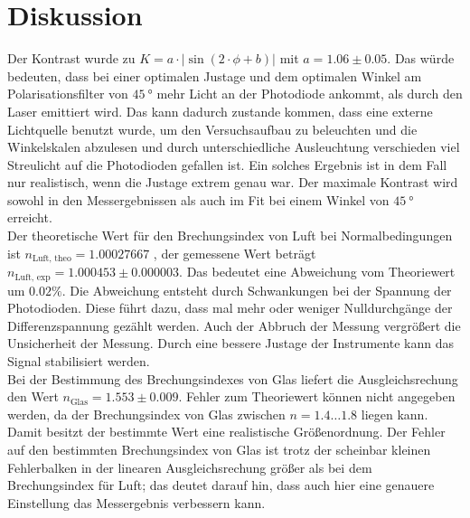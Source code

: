 \section{Diskussion}

Der Kontrast wurde zu $K = a \cdot | \sin (2 \cdot \phi + b) |$ mit $a = 1.06 \pm 0.05$. Das würde
bedeuten, dass bei einer optimalen Justage und dem optimalen Winkel am Polarisationsfilter von
$\SI{45}{\degree}$ mehr Licht an der Photodiode ankommt, als durch den Laser emittiert wird. Das kann
dadurch zustande kommen, dass eine externe Lichtquelle benutzt wurde, um den Versuchsaufbau zu beleuchten
und die Winkelskalen abzulesen und durch unterschiedliche Ausleuchtung verschieden viel Streulicht
auf die Photodioden gefallen ist. Ein solches Ergebnis ist in dem Fall nur realistisch, wenn die
Justage extrem genau war. Der maximale Kontrast wird sowohl in den Messergebnissen als auch im Fit bei
einem Winkel von $\SI{45}{\degree}$ erreicht.\\
\newline
Der theoretische Wert für den Brechungsindex von Luft bei Normalbedingungen ist
$n_\text{Luft, theo} = 1.00027667$ \cite{n}, der gemessene Wert beträgt
$n_\text{Luft, exp} = 1.000453 \pm 0.000003$. Das bedeutet eine Abweichung vom Theoriewert um
$0.02\%$. Die Abweichung entsteht durch Schwankungen bei der Spannung der Photodioden. Diese führt
dazu, dass mal mehr oder weniger Nulldurchgänge der Differenzspannung gezählt werden. Auch der Abbruch
der Messung vergrößert die Unsicherheit der Messung. Durch eine bessere Justage der Instrumente kann
das Signal stabilisiert werden.\\
\newline
Bei der Bestimmung des Brechungsindexes von Glas liefert die Ausgleichsrechung den Wert
$n_\text{Glas} = 1.553 \pm 0.009$. Fehler zum Theoriewert können nicht angegeben werden, da der
Brechungsindex von Glas zwischen $n = 1.4 \dots 1.8$ \cite{n} liegen kann. Damit besitzt der bestimmte
Wert eine realistische Größenordnung. Der Fehler auf den bestimmten Brechungsindex von Glas ist trotz
der scheinbar kleinen Fehlerbalken in der linearen Ausgleichsrechung größer als bei dem Brechungsindex
für Luft; das deutet darauf hin, dass auch hier eine genauere Einstellung das Messergebnis verbessern
kann.

\printbibliography
